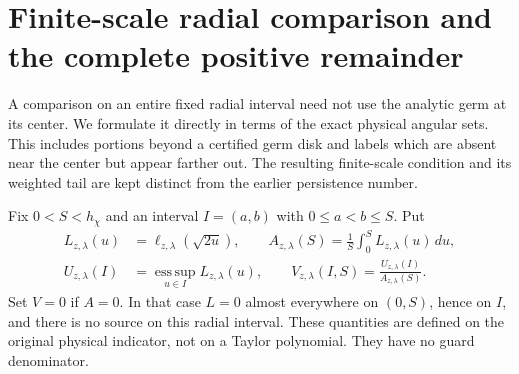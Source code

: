 \section{Finite-scale radial comparison and the complete positive remainder}
\label{sec:v69-finite-scale-coverage}
A comparison on an entire fixed radial interval need not use the
analytic germ at its center. We formulate it directly in terms of
the exact physical angular sets. This includes portions beyond a
certified germ disk and labels which are absent near the center but
appear farther out. The resulting finite-scale condition and its
weighted tail are kept distinct from the earlier persistence number.

Fix $0<S<h_\chi$ and an interval $I=(a,b)$ with
$0\le a<b\le S$. Put
\begin{align}
 L_{z,\lambda}(u)&=\ell_{z,\lambda}(\sqrt{2u}),\qquad
 A_{z,\lambda}(S)=\frac1S\int_0^S L_{z,\lambda}(u)\,du,
                                      \label{eq:v69-radial-average}\\
 U_{z,\lambda}(I)&=
          \operatorname*{ess\,sup}_{u\in I}L_{z,\lambda}(u),
 \qquad
 V_{z,\lambda}(I,S)=\frac{U_{z,\lambda}(I)}{A_{z,\lambda}(S)}.
                                      \label{eq:v69-radial-ratio}
\end{align}
Set $V=0$ if $A=0$. In that case $L=0$ almost everywhere on
$(0,S)$, hence on $I$, and there is no source on this radial interval.
These quantities are defined on the original physical indicator,
not on a Taylor polynomial. They have no guard denominator.

